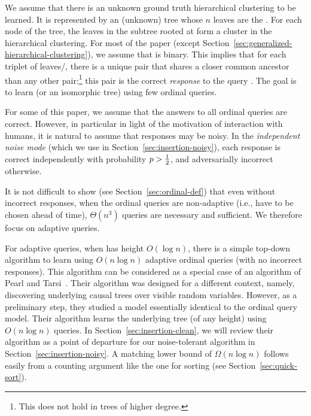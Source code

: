 We assume that there is
an unknown ground truth hierarchical clustering to be learned.
It is represented by an (unknown) tree \TreeOpt
whose $n$ leaves are the \elements.
For each node \Vertex of the tree,
the leaves in the subtree rooted at \Vertex
form a cluster in the hierarchical clustering.
For most of the paper
(except Section~\ref{sec:generalized-hierarchical-clustering}),
we assume that \TreeOpt is binary.
This implies that for each triplet \Set{\ElS, \ElSP, \ElSPP}
of leaves/\elements,
there is a unique pair that shares a closer common ancestor
than any other pair:\footnote{This does not hold in trees of higher degree.}
this pair is the correct \emph{response} to the query \Set{\ElS, \ElSP, \ElSPP}.
The goal is to learn \TreeOpt (or an isomorphic tree)
using few ordinal queries.

For some of this paper,
we assume that the answers to all ordinal queries are correct.
However, in particular in light of the motivation
of interaction with humans,
it is natural to assume that responses may be noisy.
In the \emph{independent noise mode}
(which we use in Section~\ref{sec:insertion-noisy}),
each response is correct independently with
probability $p > \Half$, and adversarially incorrect otherwise.

It is not difficult to show (see Section~\ref{sec:ordinal-def})
that even without incorrect responses,
when the ordinal queries are non-adaptive
(i.e., have to be chosen ahead of time),
$\Theta(n^3)$ queries are necessary and sufficient.
We therefore focus on adaptive queries.

For adaptive queries, when \TreeOpt has height $O(\log n)$,
there is a simple top-down algorithm to learn \TreeOpt
using $O(n \log n)$ adaptive ordinal queries
(with no incorrect responses).
This algorithm can be considered as a special case of an
algorithm of Pearl and Tarsi~\cite{pearl-tarsi:1986:strucuting}.
Their algorithm was designed for a different context, namely,
discovering underlying causal trees over visible random variables.
However, as a preliminary step, they studied a model essentially
identical to the ordinal query model.
Their algorithm learns the underlying tree (of any height)
using $O(n \log n)$ queries.
In Section~\ref{sec:insertion-clean}, we will review their algorithm
as a point of departure for our noise-tolerant algorithm in
Section~\ref{sec:insertion-noisy}.
A matching lower bound of $\Omega(n \log n)$
follows easily from a counting argument
like the one for sorting (see Section~\ref{sec:quick-sort}).

